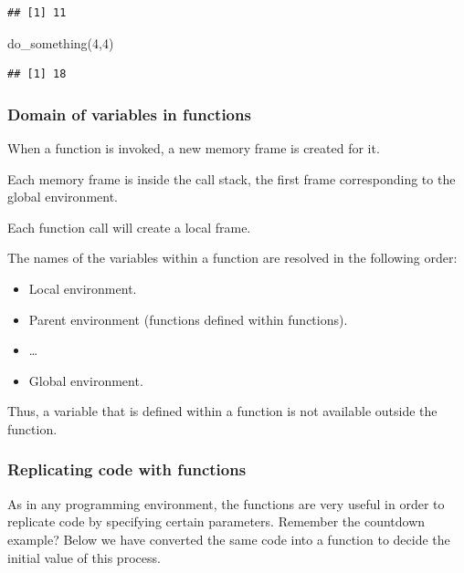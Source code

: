 \documentclass[
]{book}
\newenvironment{Shaded}{\begin{snugshade}}{\end{snugshade}}
\newcommand{\DecValTok}[1]{\textcolor[rgb]{0.00,0.00,0.81}{#1}}
\newcommand{\FunctionTok}[1]{\textcolor[rgb]{0.00,0.00,0.00}{#1}}
\newcommand{\NormalTok}[1]{#1}
\providecommand{\tightlist}{%
  \setlength{\itemsep}{0pt}\setlength{\parskip}{0pt}}
\theoremstyle{definition}
\theoremstyle{definition}
\theoremstyle{definition}
\theoremstyle{definition}
\theoremstyle{remark}
\begin{document}
\begin{verbatim}
## [1] 11
\end{verbatim}

\begin{Shaded}
\begin{Highlighting}[]
\FunctionTok{do\_something}\NormalTok{(}\DecValTok{4}\NormalTok{,}\DecValTok{4}\NormalTok{)}
\end{Highlighting}
\end{Shaded}

\begin{verbatim}
## [1] 18
\end{verbatim}

\hypertarget{domain-of-variables-in-functions}{%
\subsubsection{Domain of variables in functions}\label{domain-of-variables-in-functions}}

When a function is invoked, a new memory frame is created for it.

Each memory frame is inside the call stack, the first frame corresponding to the global environment.

Each function call will create a local frame.

The names of the variables within a function are resolved in the following order:

\begin{itemize}
\tightlist
\item
  Local environment.
\item
  Parent environment (functions defined within functions).
\item
  \ldots{}
\item
  Global environment.
\end{itemize}

Thus, a variable that is defined within a function is not available outside the function.

\hypertarget{replicating-code-with-functions}{%
\subsubsection{Replicating code with functions}\label{replicating-code-with-functions}}

As in any programming environment, the functions are very useful in order to replicate code by specifying certain parameters. Remember the countdown example? Below we have converted the same code into a function to decide the initial value of this process.
\end{document}
